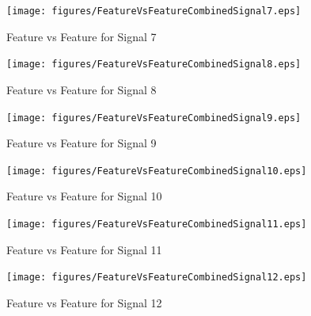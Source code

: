 \documentclass[]{article}
\begin{document}
\begin{appendices}
\begin{figure}[H]
    \centering
    \texttt{[image: figures/FeatureVsFeatureCombinedSignal7.eps]}
    \caption{Feature vs Feature for Signal 7}
\end{figure}

\begin{figure}[H]
    \centering
    \texttt{[image: figures/FeatureVsFeatureCombinedSignal8.eps]}
    \caption{Feature vs Feature for Signal 8}
\end{figure}

\begin{figure}[H]
    \centering
    \texttt{[image: figures/FeatureVsFeatureCombinedSignal9.eps]}
    \caption{Feature vs Feature for Signal 9}
\end{figure}

\begin{figure}[H]
    \centering
    \texttt{[image: figures/FeatureVsFeatureCombinedSignal10.eps]}
    \caption{Feature vs Feature for Signal 10}
\end{figure}

\begin{figure}[H]
    \centering
    \texttt{[image: figures/FeatureVsFeatureCombinedSignal11.eps]}
    \caption{Feature vs Feature for Signal 11}
\end{figure}

\begin{figure}[H]
    \centering
    \texttt{[image: figures/FeatureVsFeatureCombinedSignal12.eps]}
    \caption{Feature vs Feature for Signal 12}
\end{figure}

\end{appendices}
\end{document}
